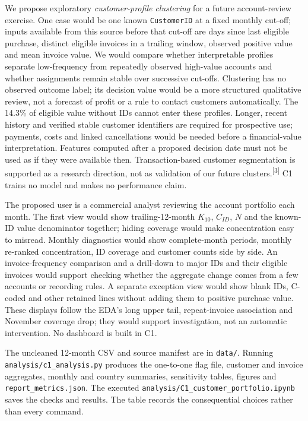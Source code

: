 \documentclass[10pt,a4paper]{article}
\newcommand{\sectionhead}[1]{\Needspace{8\baselineskip}\vspace{0.33em}{\large\bfseries\color{navy}#1}\par\vspace{0.08em}}
\newcommand{\subhead}[1]{\vspace{0.15em}{\bfseries #1}\par}
\newcommand{\source}[1]{\textsuperscript{[#1]}}
\begin{document}
\subhead{A concrete possible ML task}
We propose exploratory \emph{customer-profile clustering} for a future account-review exercise. One case would be one known \texttt{CustomerID} at a fixed monthly cut-off; inputs available from this source before that cut-off are days since last eligible purchase, distinct eligible invoices in a trailing window, observed positive value and mean invoice value. We would compare whether interpretable profiles separate low-frequency from repeatedly observed high-value accounts and whether assignments remain stable over successive cut-offs. Clustering has no observed outcome label; its decision value would be a more structured qualitative review, not a forecast of profit or a rule to contact customers automatically. The 14.3\% of eligible value without IDs cannot enter these profiles. Longer, recent history and verified stable customer identifiers are required for prospective use; payments, costs and linked cancellations would be needed before a financial-value interpretation. Features computed after a proposed decision date must not be used as if they were available then. Transaction-based customer segmentation is supported as a research direction, not as validation of our future clusters.\source{3} C1 trains no model and makes no performance claim.

\subhead{Proposed dashboard use}
The proposed user is a commercial analyst reviewing the account portfolio each month. The first view would show trailing-12-month $K_{10}$, $C_{ID}$, $N$ and the known-ID value denominator together; hiding coverage would make concentration easy to misread. Monthly diagnostics would show complete-month periods, monthly re-ranked concentration, ID coverage and customer counts side by side. An invoice-frequency comparison and a drill-down to major IDs and their eligible invoices would support checking whether the aggregate change comes from a few accounts or recording rules. A separate exception view would show blank IDs, C-coded and other retained lines without adding them to positive purchase value. These displays follow the EDA's long upper tail, repeat-invoice association and November coverage drop; they would support investigation, not an automatic intervention. No dashboard is built in C1.

\sectionhead{9\quad Process record}
\subhead{Decisions and checks}
The uncleaned 12-month CSV and source manifest are in \texttt{data/}. Running \texttt{analysis/c1\_analysis.py} produces the one-to-one flag file, customer and invoice aggregates, monthly and country summaries, sensitivity tables, figures and \texttt{report\_metrics.json}. The executed \texttt{analysis/C1\_customer\_portfolio.ipynb} saves the checks and results. The table records the consequential choices rather than every command.
\end{document}
